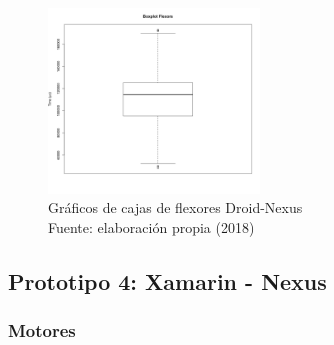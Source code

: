 \begin{figure}[H]
  \begin{center} 
   	\includegraphics[width=0.5\textwidth]{evaluation/graphics/Droid/Nexus/BoxplotFlexorsDroidNexus.png} 
    \caption[Gráficos de cajas de flexores Droid-Nexus]{Gráficos de cajas de flexores Droid-Nexus\\Fuente: elaboración propia (2018)} 
    \label{fig:droid-nexus-boxplot-flexors}
  \end{center}
\end{figure}

\subsection{Prototipo 4: Xamarin - Nexus}

\subsubsection{Motores}


